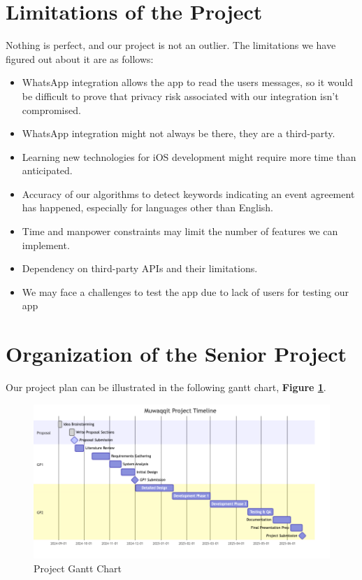 \documentclass[12pt,a4paper]{report}
\begin{document}
\section{Limitations of the Project}

Nothing is perfect, and our project is not an outlier. The limitations we have figured out about it are as follows:
\begin{itemize}
    \item WhatsApp integration allows the app to read the users messages, so it would be difficult to prove that privacy risk associated with our integration isn't compromised.
    \item WhatsApp integration might not always be there, they are a third-party.
    \item Learning new technologies for iOS development might require more time than anticipated.
    \item Accuracy of our algorithms to detect keywords indicating an event agreement has happened, especially for languages other than English.
    \item Time and manpower constraints may limit the number of features we can implement.
    \item Dependency on third-party APIs and their limitations.
    \item We may face a challenges to test the app due to lack of users for testing our app
\end{itemize}

\newpage

\section{Organization of the Senior Project}

Our project plan can be illustrated in the following gantt chart, \textbf{Figure \ref{fig:project-gantt-chart}}.

\begin{figure}[!h]
    \centering
    \includegraphics[width=\textwidth]{images/gantt.png}
    \caption{Project Gantt Chart}
    \label{fig:project-gantt-chart}
\end{figure}
\end{document}
